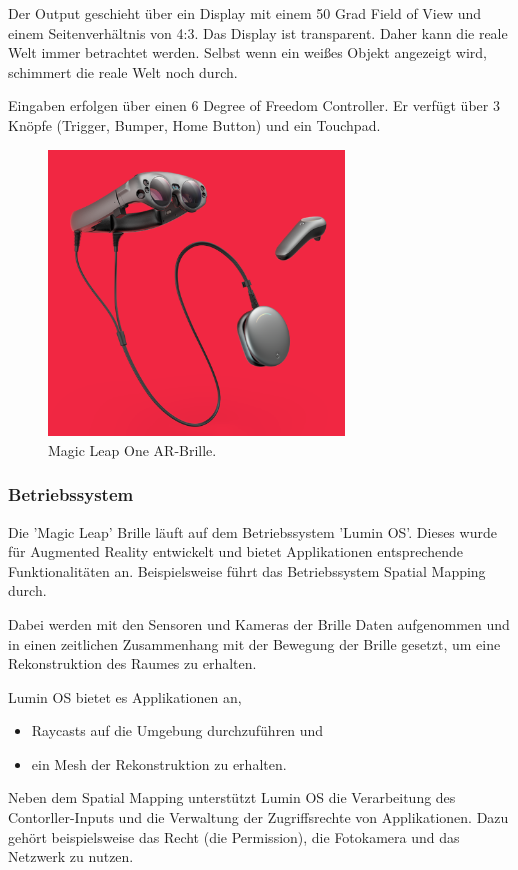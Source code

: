Der Output geschieht über ein Display mit einem 50 Grad Field of View und einem Seitenverhältnis von 4:3. Das Display ist transparent. Daher kann die reale Welt immer betrachtet werden. Selbst wenn ein weißes Objekt angezeigt wird, schimmert die reale Welt noch durch. 

Eingaben erfolgen über einen 6 Degree of Freedom Controller. Er verfügt über 3 Knöpfe (Trigger, Bumper, Home Button) und ein Touchpad. \citep{mlofficialsalespitch,mlglossary}

\begin{figure}[H]
	\centering
	\includegraphics[width=0.7\textwidth]{images/img_magicLeap.PNG}
	\caption[Magic Leap One AR-Brille.\citep{mlImage}]{Magic Leap One AR-Brille.\citep{mlImage}}
	\label{magcileap}
\end{figure}

\subsubsection{Betriebssystem}
Die 'Magic Leap' Brille läuft auf dem Betriebssystem 'Lumin OS'. Dieses wurde für Augmented Reality entwickelt und bietet Applikationen entsprechende Funktionalitäten an. Beispielsweise führt das Betriebssystem Spatial Mapping durch.\citep{mlluminOS,mlluminfeatures}

Dabei werden mit den Sensoren und Kameras der Brille Daten aufgenommen und in einen zeitlichen Zusammenhang mit der Bewegung der Brille gesetzt, um eine Rekonstruktion des Raumes zu erhalten.\citep{mlluminOS,mlluminfeatures,mlluminworldreconstruktion,mlmeshingunity}

Lumin OS bietet es Applikationen an,
\begin{itemize}
	\item Raycasts auf die Umgebung durchzuführen und
	\item ein Mesh der Rekonstruktion zu erhalten.
\end{itemize}
Neben dem Spatial Mapping unterstützt Lumin OS die Verarbeitung des Contorller-Inputs und die Verwaltung der Zugriffsrechte von Applikationen. Dazu gehört beispielsweise das Recht (die Permission), die Fotokamera und das Netzwerk zu nutzen.\citep{mlluminfeatures,mlappsecurity}

